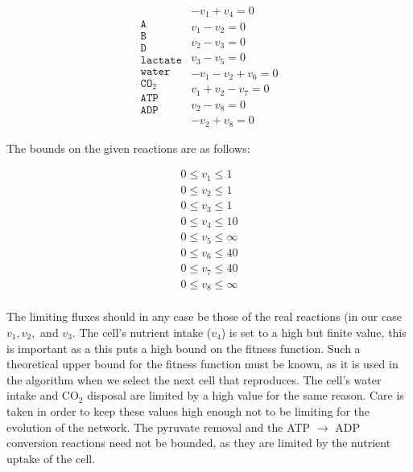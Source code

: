 \documentclass[a4paper,12pt]{article}
\begin{document}
	\begin{equation}\label{eq:lineqs}
	\begin{matrix}
		\texttt{A}   \\
		\texttt{B}\\
		\texttt{D}\\
		\texttt{lactate}\\
		\texttt{water}\\
		\texttt{CO}_2\\
		\texttt{ATP}\\
		\texttt{ADP}
	\end{matrix}
		\begin{matrix}
			- v_1+v_4=0 \\
			v_1-v_2=0 \\
			v_2-v_3=0 \\
			v_3-v_5=0 \\
			-v_1-v_2+v_6=0 \\
			v_1+v_2-v_7=0 \\
			v_2-v_8=0 \\
			-v_2+v_8=0
		\end{matrix}
	\end{equation}

	The bounds on the given reactions are as follows: 

	\begin{equation}\label{eq:bounds}
		\begin{matrix}
			0\leq v_1 \leq 1\\
			0\leq v_2 \leq 1\\
			0\leq v_3 \leq 1\\
			0\leq v_4 \leq 10\\
			0\leq v_5 \leq \infty \\
			0\leq v_6 \leq 40\\
			0\leq v_7 \leq 40\\
			0\leq v_8 \leq \infty\\
		\end{matrix}
	\end{equation}

	The limiting fluxes should in any case be those of the real reactions (in our case $v_1, v_2,$ and $v_3$. The cell's nutrient intake ($v_4$) is set to a high but finite value, this is important as a this puts a high bound on the fitness function. Such a theoretical upper bound for the fitness function must be known, as it is used in the algorithm when we select the next cell that reproduces. The cell's water intake and CO$_2$ disposal are limited by a high value for the same reason. Care is taken in order to keep these values high enough not to be limiting for the evolution of the network. %
	The pyruvate removal and the ATP $\rightarrow$ ADP conversion reactions need not be bounded, as they are limited by the nutrient uptake of the cell. 
\end{document}
